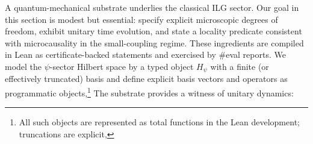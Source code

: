 \documentclass[aps,prd,twocolumn,superscriptaddress,nofootinbib,floatfix,longbibliography]{revtex4-2}
\begin{document}
%
%
A quantum-mechanical substrate underlies the classical ILG sector. Our goal in this section is modest but essential: specify explicit microscopic degrees of freedom, exhibit unitary time evolution, and state a locality predicate consistent with microcausality in the small-coupling regime. These ingredients are compiled in Lean as certificate-backed statements and exercised by \#eval reports.
%
We model the $\psi$-sector Hilbert space by a typed object $H_\psi$ with a finite (or effectively truncated) basis and define explicit basis vectors and operators as programmatic objects,\footnote{All such objects are represented as total functions in the Lean development; truncations are explicit,}
%
The substrate provides a witness of unitary dynamics:
%
\end{document}
